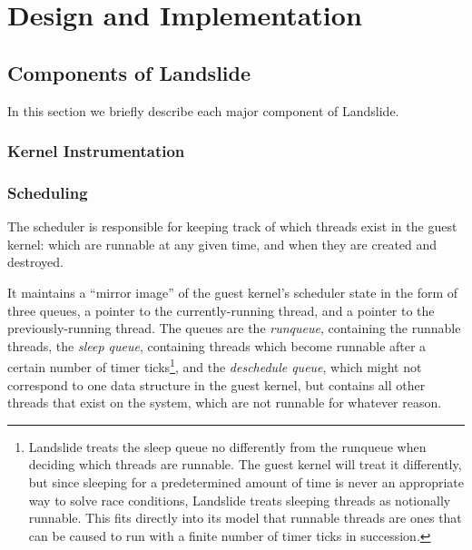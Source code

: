 \chapter{Design and Implementation}

\section{Components of Landslide}

In this section we briefly describe each major component of Landslide. %

\subsection{Kernel Instrumentation}
\label{sec:components-kern}

\subsection{Scheduling}
\label{sec:components-sched}

The scheduler is responsible for keeping track of which threads exist in the guest kernel: which are runnable at any given time, and when they are created and destroyed.

It maintains a ``mirror image'' of the guest kernel's scheduler state in the form of three queues, a pointer to the currently-running thread, and a pointer to the previously-running thread. The queues are the {\em runqueue}, containing the runnable threads, the {\em sleep queue}, containing threads which become runnable after a certain number of timer ticks\footnote{
Landslide treats the sleep queue no differently from the runqueue when deciding which threads are runnable. The guest kernel will treat it differently, but since sleeping for a predetermined amount of time is never an appropriate way to solve race conditions, Landslide treats sleeping threads as notionally runnable. This fits directly into its model that runnable threads are ones that can be caused to run with a finite number of timer ticks in succession.},
and the {\em deschedule queue}, which might not correspond to one data structure in the guest kernel, but contains all other threads that exist on the system, which are not runnable for whatever reason.

